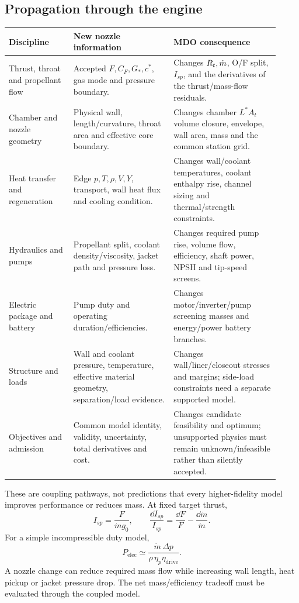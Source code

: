 \subsection{Propagation through the engine}
\begin{longtable}{@{}P{0.22\linewidth}P{0.34\linewidth}P{0.36\linewidth}@{}}
\toprule\textbf{Discipline} & \textbf{New nozzle information} & \textbf{MDO consequence}\\\midrule
\endhead
Thrust, throat and propellant flow &
Accepted \(F,C_F,G_*,c^*\), gas mode and pressure boundary. &
Changes \(R_t,\dot m\), O/F split, \(I_{sp}\), and the derivatives of
the thrust/mass-flow residuals.\\
Chamber and nozzle geometry &
Physical wall, length/curvature, throat area and effective core boundary. &
Changes chamber \(L^*A_t\) volume closure, envelope, wall area, mass
and the common station grid.\\
Heat transfer and regeneration &
Edge \(p,T,\rho,V,Y\), transport, wall heat flux and cooling condition. &
Changes wall/coolant temperatures, coolant enthalpy rise, channel
sizing and thermal/strength constraints.\\
Hydraulics and pumps &
Propellant split, coolant density/viscosity, jacket path and pressure loss. &
Changes required pump rise, volume flow, efficiency, shaft power,
NPSH and tip-speed screens.\\
Electric package and battery &
Pump duty and operating duration/efficiencies. &
Changes motor/inverter/pump screening masses and energy/power
battery branches.\\
Structure and loads &
Wall and coolant pressure, temperature, effective material geometry,
separation/load evidence. &
Changes wall/liner/closeout stresses and margins; side-load
constraints need a separate supported model.\\
Objectives and admission &
Common model identity, validity, uncertainty, total derivatives and cost. &
Changes candidate feasibility and optimum; unsupported physics
must remain unknown/infeasible rather than silently accepted.\\
\bottomrule
\end{longtable}

These are coupling pathways, not predictions that every higher-fidelity
model improves performance or reduces mass. At fixed target thrust,
\[
I_{sp}=\frac{F}{\dot m g_0},\qquad
\frac{\dd I_{sp}}{I_{sp}}=
\frac{\dd F}{F}-\frac{\dd\dot m}{\dot m}.
\]
For a simple incompressible duty model,
\[
P_{\mathrm{elec}}\simeq
\frac{\dot m\,\Delta p}{\rho\,\eta_p\eta_{\mathrm{drive}}}.
\]
A nozzle change can reduce required mass flow while increasing wall
length, heat pickup or jacket pressure drop. The net mass/efficiency
tradeoff must be evaluated through the coupled model.

